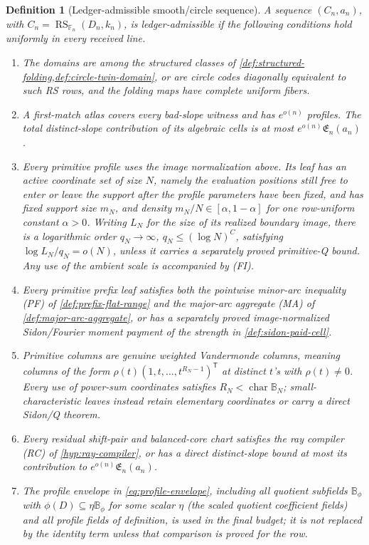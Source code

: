 \documentclass[12pt,a4paper]{amsart}
\numberwithin{equation}{section}
\newtheorem{definition}[definition]{Definition}
\theoremstyle{remark}
\DeclareMathOperator{\RS}{RS}
\newcommand{\F}{\mathbb F}
\newcommand{\B}{\mathbb B}
\begin{document}
\begin{definition}[Ledger-admissible smooth/circle sequence]
\label{def:admissible-sequence}
A sequence \((C_n,a_n)\), with \(C_n=\RS_{\F_n}(D_n,k_n)\), is
ledger-admissible if the following conditions hold uniformly in every
received line.
\begin{enumerate}[label=\textup{(A\arabic*)},leftmargin=*]
\item The domains are among the structured classes of
      \cref{def:structured-folding,def:circle-twin-domain}, or are circle
      codes diagonally equivalent to such RS rows, and the folding maps
      have complete uniform fibers.
\item A first-match atlas covers every bad-slope witness and has
      \(e^{o(n)}\) profiles.  The total \emph{distinct-slope} contribution
      of its algebraic cells is at most \(e^{o(n)}\mathfrak E_n(a_n)\).
\item Every primitive profile uses the image normalization above.  Its
      leaf has an \emph{active coordinate set} of size \(N\), namely the
      evaluation positions still free to enter or leave the support after
      the profile parameters have been fixed, and has fixed support size
      \(m_N\), and density
      \(m_N/N\in[\alpha,1-\alpha]\) for one row-uniform constant
      \(\alpha>0\).  Writing \(L_N\) for the size of its realized boundary
      image, there is a logarithmic order \(q_N\to\infty\),
      \(q_N\le(\log N)^C\), satisfying
      \(\log L_N/q_N=o(N)\), unless it carries a separately proved
      primitive-Q bound.  Any use of the ambient scale is accompanied by
      \textup{(FI)}.
\item Every primitive prefix leaf satisfies both the pointwise minor-arc
      inequality \textup{(PF)} of \cref{def:prefix-flat-range} and the
      major-arc aggregate \textup{(MA)} of
      \cref{def:major-arc-aggregate}, or has a separately proved
      image-normalized Sidon/Fourier moment payment of the strength in
      \cref{def:sidon-paid-cell}.
\item Primitive columns are genuine weighted Vandermonde columns, meaning
      columns of the form
      \(\rho(t)(1,t,\ldots,t^{R_N-1})^{\mathsf T}\) at distinct
      \(t\)'s with \(\rho(t)\ne0\).  Every
      use of power-sum coordinates satisfies
      \(R_N<\operatorname{char}\B_N\); small-characteristic leaves instead
      retain elementary coordinates or carry a direct Sidon/Q theorem.
\item Every residual shift-pair and balanced-core chart satisfies the ray
      compiler \textup{(RC)} of \cref{hyp:ray-compiler}, or has a direct
      distinct-slope bound at most its contribution to
      \(e^{o(n)}\mathfrak E_n(a_n)\).
\item The profile envelope in \eqref{eq:profile-envelope}, including all
      quotient subfields \(\B_\phi\) with
      \(\phi(D)\subseteq\eta\B_\phi\) for some scalar \(\eta\)
      (the \emph{scaled quotient coefficient fields}) and all profile fields of
      definition, is used in
      the final budget; it is not replaced by the identity term unless that
      comparison is proved for the row.
\end{enumerate}
\end{definition}
\end{document}
